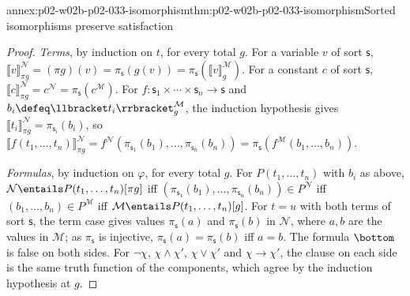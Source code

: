 \begin{annexitem}{annex:p02-w02b-p02-033-isomorphism}{thm:p02-w02b-p02-033-isomorphism}{Sorted isomorphisms preserve satisfaction}
\begin{proof}
\emph{Terms}, by induction on \(t\), for every total \(g\).  For a variable
\(v\) of sort \(\mathsf s\),
\(\llbracket v\rrbracket^{\mathcal N}_{\pi g}=(\pi g)(v)=
\pi_{\mathsf s}(g(v))=\pi_{\mathsf s}(\llbracket v\rrbracket^{\mathcal M}_{g})\).
For a constant \(c\) of sort \(\mathsf s\),
\(\llbracket c\rrbracket^{\mathcal N}_{\pi g}=c^{\mathcal N}=
\pi_{\mathsf s}(c^{\mathcal M})\).  For
\(f:\mathsf s_1\times\cdots\times\mathsf s_n\longrightarrow\mathsf s\) and
\(b_i\defeq\llbracket t_i\rrbracket^{\mathcal M}_{g}\), the induction
hypothesis gives
\(\llbracket t_i\rrbracket^{\mathcal N}_{\pi g}=\pi_{\mathsf s_i}(b_i)\), so
\(\llbracket f(t_1,\ldots,t_n)\rrbracket^{\mathcal N}_{\pi g}=
f^{\mathcal N}(\pi_{\mathsf s_1}(b_1),\ldots,\pi_{\mathsf s_n}(b_n))=
\pi_{\mathsf s}(f^{\mathcal M}(b_1,\ldots,b_n))\).

\emph{Formulas}, by induction on \(\varphi\), for every total \(g\).  For
\(P(t_1,\ldots,t_n)\) with \(b_i\) as above,
\(\mathcal N\entails P(t_1,\ldots,t_n)[\pi g]\) iff
\((\pi_{\mathsf s_1}(b_1),\ldots,\pi_{\mathsf s_n}(b_n))\in P^{\mathcal N}\)
iff \((b_1,\ldots,b_n)\in P^{\mathcal M}\) iff
\(\mathcal M\entails P(t_1,\ldots,t_n)[g]\).  For \(t=u\) with both terms of
sort \(\mathsf s\), the term case gives values \(\pi_{\mathsf s}(a)\) and
\(\pi_{\mathsf s}(b)\) in \(\mathcal N\), where \(a,b\) are the values in
\(\mathcal M\); as \(\pi_{\mathsf s}\) is injective,
\(\pi_{\mathsf s}(a)=\pi_{\mathsf s}(b)\) iff \(a=b\).  The formula
\(\bottom\) is false on both sides.  For \(\neg\chi\), \(\chi\land\chi'\),
\(\chi\lor\chi'\) and \(\chi\to\chi'\), the clause on each side is the same
truth function of the components, which agree by the induction hypothesis at
\(g\).


\end{proof}
\end{annexitem}
